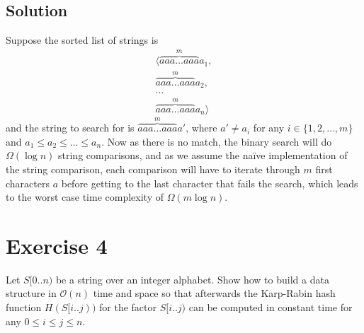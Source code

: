 \documentclass[10pt]{article}
\begin{document}
\subsection*{Solution}
Suppose the sorted list of strings is 
\begin{align*}
\langle \overbrace{aaa \dots aaa}^{m}a_1, \\
\overbrace{aaa \dots aaa}^{m}a_2, \\
\dots \\
\overbrace{aaa \dots aaa}^{m}a_n \rangle
\end{align*}
and the string to search for is $\overbrace{aaa \dots aaa}^{m}a'$, where $a' \neq a_i$ for any $i \in \{ 1, 2, \dots, m \}$ and $a_1 \leq  a_2 \leq \dots \leq a_n$. Now as there is no match, the binary search will do $\Omega(\log n)$ string comparisons, and as we assume the naïve implementation of the string comparison, each comparison will have to iterate through $m$ first characters $a$ before getting to the last character that fails the search, which leads to the worst case time complexity of $\Omega(m \log n)$.

\section*{Exercise 4}
\color{blue}
Let $S[0..n)$ be a string over an integer alphabet. Show how to build a data structure in $\mathcal{O}(n)$ time and space so that afterwards the Karp-Rabin hash function $H(S[i..j))$ for the factor $S[i..j)$ can be computed in constant time for any $0 \leq i \leq j \leq n$.
\color{black}
\end{document}
